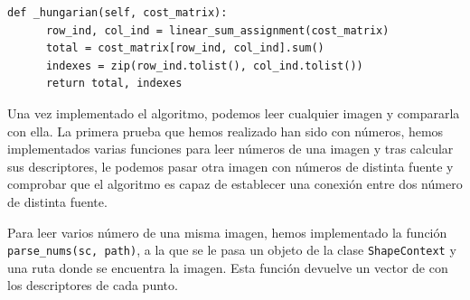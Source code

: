 \documentclass[size=a4, parskip=half, titlepage=false, toc=flat, toc=bib, 12pt]{scrartcl}
\begin{document}
\begin{verbatim}
def _hungarian(self, cost_matrix):
      row_ind, col_ind = linear_sum_assignment(cost_matrix)
      total = cost_matrix[row_ind, col_ind].sum()
      indexes = zip(row_ind.tolist(), col_ind.tolist())
      return total, indexes
\end{verbatim}

Una vez implementado el algoritmo, podemos leer cualquier imagen y compararla con ella. La primera prueba que hemos realizado han sido con números, hemos implementados varias funciones para leer números de una imagen y tras calcular sus descriptores, le podemos pasar otra imagen con números de distinta fuente y comprobar que el algoritmo es capaz de establecer una conexión entre dos número de distinta fuente.

Para leer varios número de una misma imagen, hemos implementado la función \verb|parse_nums(sc, path)|, a la que se le pasa un objeto de la clase \verb|ShapeContext| y una ruta donde se encuentra la imagen. Esta función devuelve un vector de con los descriptores de cada punto.
\end{document}
